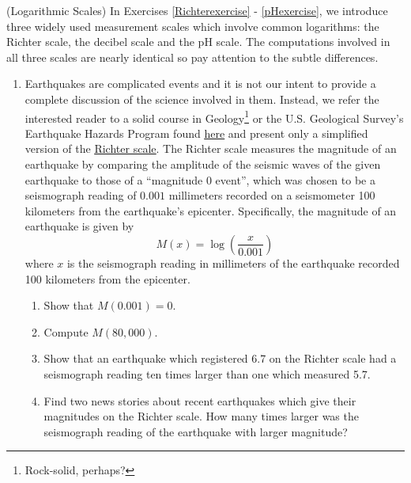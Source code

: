 \pagebreak

\label{logarithmicscales}

(Logarithmic Scales) In Exercises \ref{Richterexercise} - \ref{pHexercise}, we introduce three widely used measurement scales which involve common logarithms: the Richter scale, the decibel scale and the pH scale.  The computations involved in all three scales are nearly identical so pay attention to the subtle differences. 

\begin{enumerate}
\setcounter{enumi}{\value{HW}}

\item \label{Richterexercise}   Earthquakes are complicated events and it is not our intent to provide a complete discussion of the science involved in them.  Instead, we refer the interested reader to a solid course in Geology\footnote{Rock-solid, perhaps?} or the U.S. Geological Survey's Earthquake Hazards Program found \href{http://earthquake.usgs.gov/}{\underline{here}} and present only a simplified version of the \href{http://en.wikipedia.org/wiki/Richter_scale}{\underline{Richter scale}}.  The Richter scale measures the magnitude of an earthquake by comparing the amplitude of the seismic waves of the given earthquake to those of a ``magnitude 0 event'', which was chosen to be a seismograph reading of $0.001$ millimeters recorded on a seismometer 100 kilometers from the earthquake's epicenter.  Specifically, the magnitude of an earthquake is given by \[M(x) = \log \left(\dfrac{x}{0.001}\right)\] where $x$ is the seismograph reading in millimeters of the earthquake recorded 100 kilometers from the epicenter.  

\begin{enumerate}

\item Show that $M(0.001) = 0$.
\item Compute $M(80,000)$.
\item Show that an earthquake which registered 6.7 on the Richter scale had a seismograph reading ten times larger than one which measured 5.7.
\item Find two news stories about recent earthquakes which give their magnitudes on the Richter scale.  How many times larger was the seismograph reading of the earthquake with larger magnitude?

\end{enumerate}


\end{enumerate}
